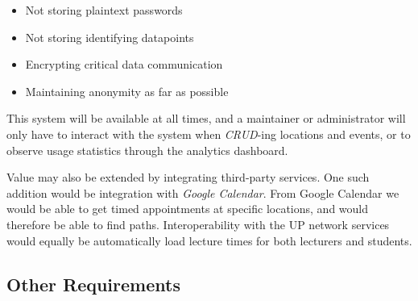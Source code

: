 \documentclass[10pt,a4paper]{article}
\begin{document}
			\begin{itemize}
				\item Not storing plaintext passwords
				\item Not storing identifying datapoints
				\item Encrypting critical data communication
				\item Maintaining anonymity as far as possible
			\end{itemize}

			This system will be available at all times, and a
			maintainer or administrator will only have to interact with the system
			when \textsl{CRUD}-ing locations and events, or to observe usage
			statistics through the analytics dashboard.

			\medskip

			Value may also be extended by integrating third-party services. One such
			addition would be integration with \textsl{Google Calendar}. From Google
			Calendar we would be able to get timed appointments at specific locations,
			and would therefore be able to find paths. Interoperability with the UP
			network services would equally be automatically load lecture times for
			both lecturers and students.

		\subsection{Other Requirements}
\end{document}
